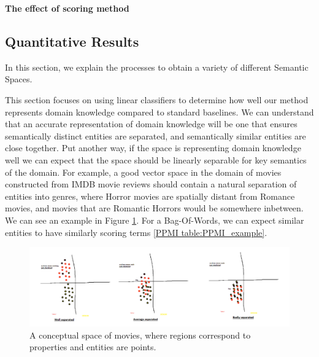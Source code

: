 \textbf{The effect of scoring method}

\subsection{Quantitative Results}




In this section, we explain the processes to obtain a variety of different Semantic Spaces. \label{ch3:Method}

This section focuses on using linear classifiers to determine how well our method represents domain knowledge compared to standard baselines. We can understand that an accurate representation of domain knowledge will be one that ensures semantically distinct entities are separated, and semantically similar entities are close together. Put another way, if the space is representing domain knowledge well we can expect that the space should be linearly separable for key semantics of the domain. For example, a good vector space in the domain of movies constructed from IMDB movie reviews should contain a natural separation of entities into genres, where Horror movies are spatially distant from Romance movies, and movies that are Romantic Horrors would be somewhere inbetween. We can see an example in Figure \ref{figure:genres_separated}. For a Bag-Of-Words, we can expect similar entities to have similarly scoring terms \ref{PPMI table:PPMI_example}.

\begin{figure}[t]
	\includegraphics[width=\textwidth]{images/genres_separated.png}
	\centering
	\caption{A conceptual space of movies, where regions correspond to properties and entities are points.}\label{figure:genres_separated}
\end{figure}

